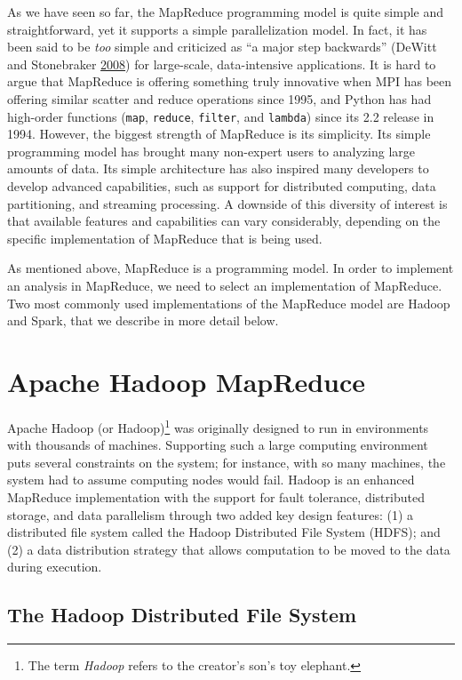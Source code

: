 \documentclass[]{krantz}
\begin{document}
As we have seen so far, the MapReduce programming model is quite simple
and straightforward, yet it supports a simple parallelization model. In
fact, it has been said to be \emph{too} simple and criticized as ``a
major step backwards'' (DeWitt and Stonebraker
\protect\hyperlink{ref-MapReduceBad}{2008}) for large-scale,
data-intensive applications. It is hard to argue that MapReduce is
offering something truly innovative when MPI has been offering similar
scatter and reduce operations since 1995, and Python has had high-order
functions (\texttt{map}, \texttt{reduce}, \texttt{filter}, and
\texttt{lambda}) since its 2.2 release in 1994. However, the biggest
strength of MapReduce is its simplicity. Its simple programming model
has brought many non-expert users to analyzing large amounts of data.
Its simple architecture has also inspired many developers to develop
advanced capabilities, such as support for distributed computing, data
partitioning, and streaming processing. A downside of this diversity of
interest is that available features and capabilities can vary
considerably, depending on the specific implementation of MapReduce that
is being used.

As mentioned above, MapReduce is a programming model. In order to
implement an analysis in MapReduce, we need to select an implementation
of MapReduce. Two most commonly used implementations of the MapReduce
model are Hadoop and Spark, that we describe in more detail below.

\section{Apache Hadoop MapReduce}\label{apache-hadoop-mapreduce}

Apache Hadoop (or Hadoop)\footnote{The term \emph{Hadoop} refers to the
  creator's son's toy elephant.} was originally designed to run in
environments with thousands of machines. Supporting such a large
computing environment puts several constraints on the system; for
instance, with so many machines, the system had to assume computing
nodes would fail. Hadoop is an enhanced MapReduce implementation with
the support for fault tolerance, distributed storage, and data
parallelism through two added key design features: (1) a distributed
file system called the Hadoop Distributed File System (HDFS); and (2) a
data distribution strategy that allows computation to be moved to the
data during execution.

\subsection{The Hadoop Distributed File
System}\label{the-hadoop-distributed-file-system}
\end{document}
